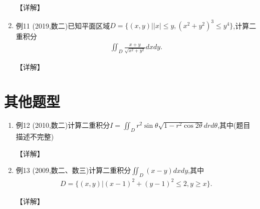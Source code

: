 \documentclass[12pt, a4paper, oneside, UTF8]{ctexbook}
\begin{document}
\begin{enumerate}[label=\arabic*.,start=6]
    \begin{solution}
    【详解】
    \end{solution}
    
    \item 例11 (2019,数二)已知平面区域$D=\{(x,y)||x|\leq y,(x^2+y^2)^3\leq y^4\}$,计算二重积分
    \begin{align*}
        \iint_D\frac{x+y}{\sqrt{x^2+y^2}}dxdy.
    \end{align*}
    
    \begin{solution}
    【详解】
    \end{solution}
\end{enumerate}

\section{其他题型}

\begin{enumerate}[label=\arabic*.,start=13]
    \item 例12 (2010,数二)计算二重积分$I=\iint_D r^2\sin\theta\sqrt{1-r^2\cos 2\theta} drd\theta$,其中(题目描述不完整)
    
    \begin{solution}
    【详解】
    \end{solution}
    
    \item 例13 (2009,数二、数三)计算二重积分$\iint_D(x-y)dxdy$,其中
    \begin{align*}
        D=\{(x,y)|(x-1)^2+(y-1)^2\leq 2,y\geq x\}.
    \end{align*}
    
    \begin{solution}
    【详解】
    \end{solution}
\end{enumerate}

\ifx\allfiles\undefined
\end{document}
